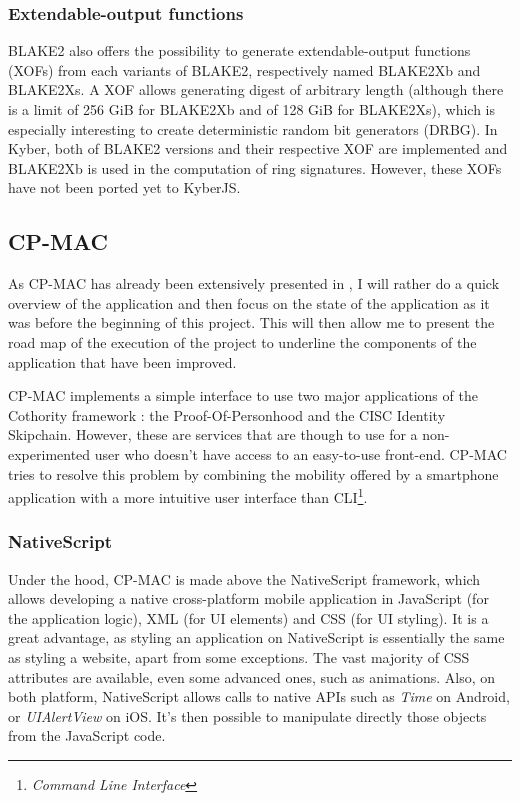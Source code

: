\subsubsection*{Extendable-output functions}
BLAKE2 also offers the possibility to generate extendable-output functions (XOFs) from each variants of BLAKE2, respectively named BLAKE2Xb and BLAKE2Xs. A XOF allows generating digest of arbitrary length (although there is a limit of 256 GiB for BLAKE2Xb and of 128 GiB for BLAKE2Xs), which is especially interesting to create deterministic random bit generators (DRBG). In Kyber, both of BLAKE2 versions and their respective XOF are implemented and BLAKE2Xb is used in the computation of ring signatures. However, these XOFs have not been ported yet to KyberJS.

\subsection{CP-MAC}
As CP-MAC has already been extensively presented in \cite{petrimaire2018}, I will rather do a quick overview of the application and then focus on the state of the application as it was before the beginning of this project. This will then allow me to present the road map of the execution of the project to underline the components of the application that have been improved.

CP-MAC implements a simple interface to use two major applications of the Cothority framework : the Proof-Of-Personhood and the CISC Identity Skipchain. However, these are services that are though to use for a non-experimented user who doesn't have access to an easy-to-use front-end. CP-MAC tries to resolve this problem by combining the mobility offered by a smartphone application with a  more intuitive user interface than CLI\footnote{\textit{Command Line Interface}}.

\subsubsection*{NativeScript}
Under the hood, CP-MAC is made above the NativeScript framework, which allows developing a native cross-platform mobile application in JavaScript (for the application logic), XML (for UI elements) and CSS (for UI styling). It is a great advantage, as styling an application on NativeScript is essentially the same as styling a website, apart from some exceptions. The vast majority of CSS attributes are available, even some advanced ones, such as animations. Also, on both platform, NativeScript allows calls to native APIs such as \textit{Time} on Android, or \textit{UIAlertView} on iOS. It's then possible to manipulate directly those objects from the JavaScript code. 

